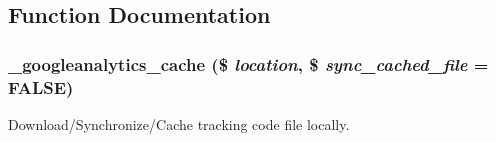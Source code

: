 \subsection{Function Documentation}
\hypertarget{googleanalytics_8module_afefec8ddd7cf3beac77ad646aebbb675}{
\subsubsection[{\_\-googleanalytics\_\-cache}]{\setlength{\rightskip}{0pt plus 5cm}\_\-googleanalytics\_\-cache (\$ {\em location}, \/  \$ {\em sync\_\-cached\_\-file} = {\ttfamily FALSE})}}
\label{googleanalytics_8module_afefec8ddd7cf3beac77ad646aebbb675}
Download/Synchronize/Cache tracking code file locally.


